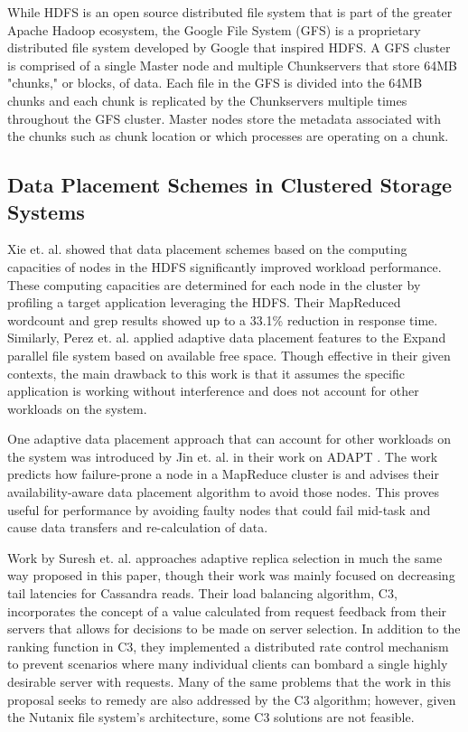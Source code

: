 \documentclass[12pt]{article}
\begin{document}
  While HDFS is an open source distributed file system that is part of the
  greater Apache Hadoop ecosystem, the Google File System (GFS) \cite{gfs} is a
  proprietary distributed file system developed by Google that inspired HDFS. A
  GFS cluster is comprised of a single Master node and multiple Chunkservers
  that store 64MB "chunks," or blocks, of data. Each file in the GFS is divided
  into the 64MB chunks and each chunk is replicated by the Chunkservers
  multiple times throughout the GFS cluster. Master nodes store the metadata
  associated with the chunks such as chunk location or which processes are
  operating on a chunk.

  \subsection{Data Placement Schemes in Clustered Storage Systems}

  Xie et. al. \cite{xie2010} showed that data placement schemes based on the
  computing capacities of nodes in the HDFS significantly improved workload
  performance. These computing capacities are determined for each node in the
  cluster by profiling a target application leveraging the HDFS. Their
  MapReduced wordcount and grep results showed up to a 33.1\% reduction in
  response time. Similarly, Perez et. al. \cite{perez2003} applied adaptive
  data placement features to the Expand parallel file system based on available
  free space. Though effective in their given contexts, the main drawback to
  this work is that it assumes the specific application is working without
  interference and does not account for other workloads on the system.

  One adaptive data placement approach that can account for other workloads on
  the system was introduced by Jin et. al. \cite{adapt2012} in their work on
  ADAPT . The work predicts how failure-prone a node in a MapReduce cluster is
  and advises their availability-aware data placement algorithm to avoid those
  nodes. This proves useful for performance by avoiding faulty nodes that could
  fail mid-task and cause data transfers and re-calculation of data.

  Work by Suresh et. al. \cite{suresh2015} approaches adaptive replica
  selection in much the same way proposed in this paper, though their work was
  mainly focused on decreasing tail latencies for Cassandra \cite{cassandra}
  reads. Their load balancing algorithm, C3, incorporates the concept of a
  value calculated from request feedback from their servers that allows for
  decisions to be made on server selection. In addition to the ranking function
  in C3, they implemented a distributed rate control mechanism to prevent
  scenarios where many individual clients can bombard a single highly desirable
  server with requests. Many of the same problems that the work in this
  proposal seeks to remedy are also addressed by the C3 algorithm; however,
  given the Nutanix file system's architecture, some C3 solutions are not
  feasible.
\end{document}
